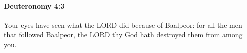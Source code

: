 
		\paragraph{Deuteronomy 4:3} %
			\label{DEUTERONOMY-4-3}

			Your eyes have seen what the LORD did because of Baalpeor: for all the men that followed Baalpeor, the LORD thy God hath destroyed them from among you.


